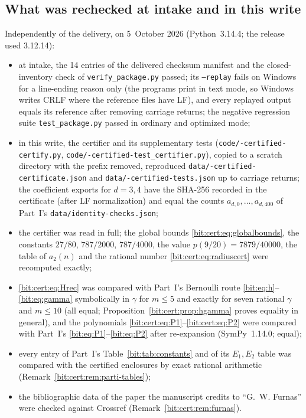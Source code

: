 \documentclass[11pt]{article}
\theoremstyle{definition}\newtheorem{definition}[theorem]{Definition}
\theoremstyle{remark}\newtheorem{remark}[theorem]{Remark}
\begin{document}
\subsection{What was rechecked at intake and in this write}\label{bit:cert:sec:rechecked}
Independently of the delivery, on 5~October 2026 (Python~3.14.4; the release
used 3.12.14):
\begin{itemize}[leftmargin=*,itemsep=0.15em]
\item at intake, the 14 entries of the delivered checksum manifest and the
 closed-inventory check of \texttt{verify\_package.py} passed; its
 \texttt{--replay} fails on Windows for a line-ending reason only (the
 programs print in text mode, so Windows writes CRLF where the reference
 files have LF), and every replayed output equals its reference after
 removing carriage returns; the negative regression suite
 \texttt{test\_package.py} passed in ordinary and optimized mode;
\item in this write, the certifier and its supplementary tests
 (\texttt{code/-certified-\allowbreak certify.py},
 \texttt{code/-certified-\allowbreak test\_certifier.py}), copied
 to a scratch directory with the prefix removed, reproduced
 \texttt{data/-certified-\allowbreak certificate.json} and
 \texttt{data/-certified-\allowbreak tests.json} up to carriage
 returns; the
 coefficient exports for $d=3,4$ have the SHA-256 recorded in the certificate
 (after LF normalization) and equal the counts $a_{d,0},\ldots,a_{d,400}$ of
 Part~I's \texttt{data/identity-checks.json};
\item the certifier was read in full; the global bounds
 \eqref{bit:cert:eq:globalbounds}, the constants $27/80$, $787/2000$,
 $787/4000$, the value $p(9/20)=7879/40000$, the table of $a_2(n)$ and the
 rational number \eqref{bit:cert:eq:radiuscert} were recomputed exactly;
\item \eqref{bit:cert:eq:Hrec} was compared with Part~I's Bernoulli route
 \eqref{bit:eq:h}--\eqref{bit:eq:gamma} symbolically in $\gamma$ for
 $m\le5$ and exactly for seven rational $\gamma$ and $m\le10$ (all equal;
 Proposition~\ref{bit:cert:prop:hgamma} proves equality in general), and the
 polynomials \eqref{bit:cert:eq:P1}--\eqref{bit:cert:eq:P2} were compared with
 Part~I's \eqref{bit:eq:P1}--\eqref{bit:eq:P2} after re-expansion (SymPy~1.14.0;
 equal);
\item every entry of Part~I's Table~\ref{bit:tab:constants} and of its
 $E_1,E_2$ table was compared with the certified enclosures by exact rational
 arithmetic (Remark~\ref{bit:cert:rem:parti-tables});
\item the bibliographic data of the paper the manuscript credits to
 ``G.~W. Furnas'' were checked against Crossref
 (Remark~\ref{bit:cert:rem:furnas}).
\end{itemize}
\end{document}
